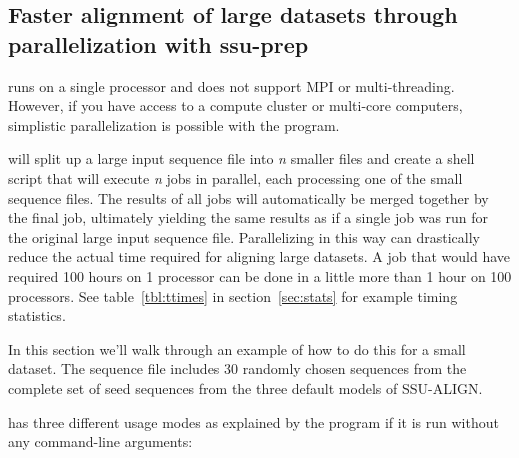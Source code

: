 \subsection{Faster alignment of large datasets through parallelization
  with ssu-prep}
\label{sec:tutorial-prep}
 runs on a single processor and does not support MPI
or multi-threading. However, if you have access to a compute
cluster or multi-core computers, simplistic parallelization is possible
with the  program.

 will split up a large input sequence file into
\emph{n} smaller files and create a shell script that will execute
\emph{n}  jobs in parallel, each processing one of the
small sequence files. The results of all jobs will automatically be
merged together by the final job, ultimately yielding the same results
as if a single 
job was run for the original large input sequence file. 
Parallelizing  in this way can drastically reduce the
actual time required for aligning large datasets. A job that would
have required 100 hours on 1 processor can be done in a little more
than 1 hour on 100 processors. See table~\ref{tbl:ttimes} in
section~\ref{sec:stats} for example timing statistics. 

In this section we'll walk through an example of how to do this for a
small dataset.  The sequence file  includes
30 randomly chosen sequences from the complete set of seed sequences
from the three default models of SSU-ALIGN.

 has three different usage modes as explained by the
program if it is run without any command-line arguments:


